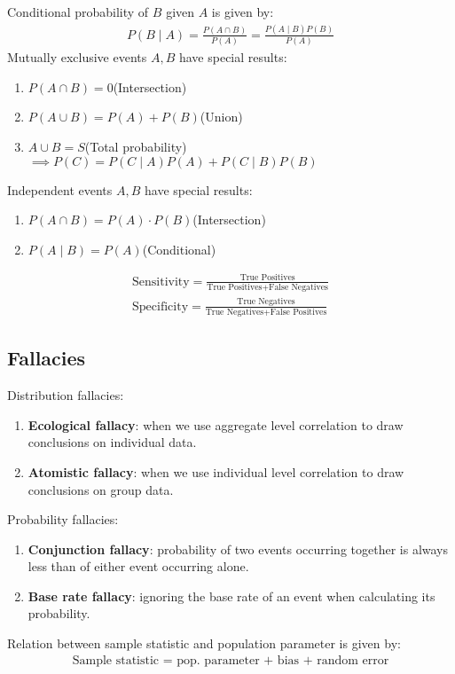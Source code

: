 \documentclass[12pt, a4paper]{article}
\begin{document}
\begin{multicols*}{3}
Conditional probability of $B$ given $A$ is given by:
\begin{align*}
  P(B\mid A) = \displaystyle\frac{P(A\cap B)}{P(A)} = \frac{P(A\mid B)P(B)}{P(A)}
\end{align*}
Mutually exclusive events $A,B$ have special results:
\begin{enumerate}[\roman*.]
  \item $P(A\cap B) = 0$\hfill(Intersection)
  \item $P(A\cup B) = P(A) + P(B)$\hfill(Union)
  \item $A \cup B = S$\hfill(Total probability)\\$\implies P(C) = P(C\mid A)P(A) + P(C\mid B)P(B)$
\end{enumerate}

Independent events $A,B$ have special results:
\begin{enumerate}[\roman*.]
  \item $P(A\cap B) = P(A)\cdot P(B)$\hfill(Intersection)
  \item $P(A\mid B) = P(A)$\hfill(Conditional)
\end{enumerate}
\begin{align*}
  \text{Sensitivity} = \frac{\text{True Positives}}{\text{True Positives} + \text{False Negatives}}\\
  \text{Specificity} = \frac{\text{True Negatives}}{\text{True Negatives} + \text{False Positives}}
\end{align*}

\subsection{Fallacies}
Distribution fallacies:
\begin{enumerate}[\roman*.]
  \item \textbf{Ecological fallacy}: when we use aggregate level correlation to draw conclusions on individual data. 
  \item \textbf{Atomistic fallacy}: when we use individual level correlation to draw conclusions on group data. 
\end{enumerate}

Probability fallacies:
\begin{enumerate}[\roman*.]
  \item \textbf{Conjunction fallacy}: probability of two events occurring together is always less than of either event occurring alone.
  \item \textbf{Base rate fallacy}: ignoring the base rate of an event when calculating its probability.
\end{enumerate}
\colbreak
Relation between sample statistic and population parameter is given by:
\begin{align*}
  \text{Sample statistic = pop. parameter + bias + random error}
\end{align*}


\end{multicols*}
\end{document}
